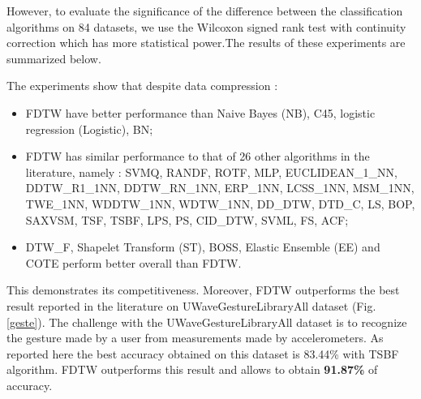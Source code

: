 However, to evaluate the significance of the difference between the classification algorithms on 84 datasets, we use the Wilcoxon signed rank test with continuity correction which has more statistical power.The results of these experiments are summarized below. 

The experiments show that despite data compression : 
\begin{itemize}
  \item  FDTW have better performance than Naive Bayes (NB), C45,  logistic regression (Logistic), BN;
  \item FDTW has similar performance to that of 26 other algorithms in the literature, namely : SVMQ, RANDF, ROTF, MLP, EUCLIDEAN\_1\_NN, DDTW\_R1\_1NN, DDTW\_RN\_1NN, ERP\_1NN, LCSS\_1NN, MSM\_1NN, TWE\_1NN, WDDTW\_1NN, WDTW\_1NN, DD\_DTW, DTD\_C, LS, BOP, SAXVSM, TSF, TSBF, LPS, PS, CID\_DTW, SVML, FS, ACF;
  \item DTW\_F, Shapelet Transform (ST), BOSS, Elastic Ensemble (EE) and COTE perform better overall than FDTW.
\end{itemize}

This demonstrates its competitiveness. Moreover, FDTW
outperforms the best result reported in the literature on  UWaveGestureLibraryAll dataset (Fig.
\ref{geste}).
The challenge with the UWaveGestureLibraryAll dataset is to recognize the gesture made by a user
from measurements made by accelerometers. As reported here \cite{Bagnall} the best accuracy obtained
on this dataset is 83.44\% with TSBF algorithm. FDTW outperforms this result and allows to obtain \textbf{91.87\%} of accuracy.


